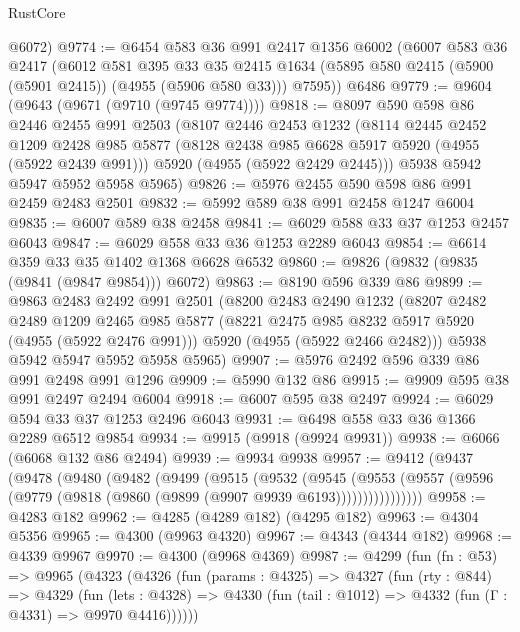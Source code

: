 \begin{lexlean}{RustCore}
\begin{coremodule}
      @6072)
@9774 := @6454
    @583
    @36
    @991
    @2417
    @1356
    @6002
    (@6007
      @583
      @36
      @2417
      (@6012
        @581
        @395
        @33
        @35
        @2415
        @1634
        (@5895 @580 @2415 (@5900 (@5901 @2415)) (@4955 (@5906 @580 @33)))
        @7595))
    @6486
@9779 := @9604 (@9643 (@9671 (@9710 (@9745 @9774))))
@9818 := @8097
    @590
    @598
    @86
    @2446
    @2455
    @991
    @2503
    (@8107
      @2446
      @2453
      @1232
      (@8114
        @2445
        @2452
        @1209
        @2428
        @985
        @5877
        (@8128 @2438 @985 @6628 @5917 @5920 (@4955 (@5922 @2439 @991)))
        @5920
        (@4955 (@5922 @2429 @2445)))
      @5938
      @5942
      @5947
      @5952
      @5958
      @5965)
@9826 := @5976 @2455 @590 @598 @86 @991 @2459 @2483 @2501
@9832 := @5992 @589 @38 @991 @2458 @1247 @6004
@9835 := @6007 @589 @38 @2458
@9841 := @6029 @588 @33 @37 @1253 @2457 @6043
@9847 := @6029 @558 @33 @36 @1253 @2289 @6043
@9854 := @6614 @359 @33 @35 @1402 @1368 @6628 @6532
@9860 := @9826 (@9832 (@9835 (@9841 (@9847 @9854))) @6072)
@9863 := @8190 @596 @339 @86
@9899 := @9863
    @2483
    @2492
    @991
    @2501
    (@8200
      @2483
      @2490
      @1232
      (@8207
        @2482
        @2489
        @1209
        @2465
        @985
        @5877
        (@8221 @2475 @985 @8232 @5917 @5920 (@4955 (@5922 @2476 @991)))
        @5920
        (@4955 (@5922 @2466 @2482)))
      @5938
      @5942
      @5947
      @5952
      @5958
      @5965)
@9907 := @5976 @2492 @596 @339 @86 @991 @2498 @991 @1296
@9909 := @5990 @132 @86
@9915 := @9909 @595 @38 @991 @2497 @2494 @6004
@9918 := @6007 @595 @38 @2497
@9924 := @6029 @594 @33 @37 @1253 @2496 @6043
@9931 := @6498 @558 @33 @36 @1366 @2289 @6512 @9854
@9934 := @9915 (@9918 (@9924 @9931))
@9938 := @6066 (@6068 @132 @86 @2494)
@9939 := @9934 @9938
@9957 := @9412
    (@9437
      (@9478
        (@9480
          (@9482
            (@9499
              (@9515
                (@9532
                  (@9545
                    (@9553
                      (@9557 (@9596 (@9779 (@9818 (@9860 (@9899 (@9907 @9939 @6193))))))))))))))))
@9958 := @4283 @182
@9962 := @4285 (@4289 @182) (@4295 @182)
@9963 := @4304 @5356
@9965 := @4300 (@9963 @4320)
@9967 := @4343 (@4344 @182)
@9968 := @4339 @9967
@9970 := @4300 (@9968 @4369)
@9987 := @4299
    (fun (fn : @53) =>
    @9965
      (@4323
        (@4326
          (fun (params : @4325) =>
          @4327
            (fun (rty : @844) =>
            @4329
              (fun (lets : @4328) =>
              @4330 (fun (tail : @1012) => @4332 (fun (Γ : @4331) => @9970 @4416))))))

\end{coremodule}
\end{lexlean}
